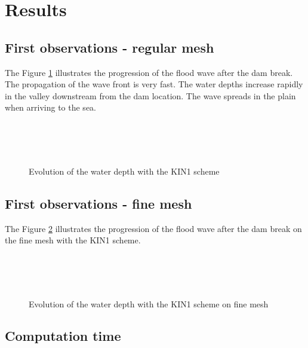 \section{Results}
\subsection{First observations - regular mesh}

The Figure \ref{fig:malpasset:WD_cin1} illustrates the progression of the flood
wave after the dam break.
The propagation of the wave front is very fast.
The water depths increase rapidly in the valley downstream from the dam location.
The wave spreads in the plain when arriving to the sea.

\begin{figure}[H]
  \centering
  \\
  \\
  \\
  \caption{Evolution of the water depth with the KIN1 scheme}\label{fig:malpasset:WD_cin1}
\end{figure}

\subsection{First observations - fine mesh}

The Figure \ref{fig:malpasset:WD_fine} illustrates the progression of the flood
wave after the dam break on the fine mesh with the KIN1 scheme.
\begin{figure}[H]
  \centering
  \\
  \\
  \\
  \caption{Evolution of the water depth with the KIN1 scheme on fine mesh}\label{fig:malpasset:WD_fine}
\end{figure}

\subsection{Computation time}

